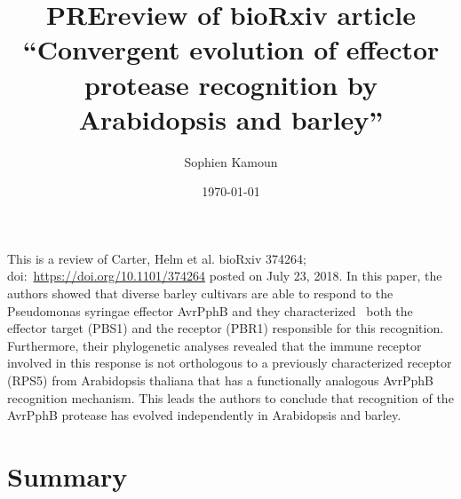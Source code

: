 \documentclass[10pt]{article}
\renewenvironment{abstract}
  {{\bfseries\noindent{\abstractname}\par\nobreak}\footnotesize}
  {\bigskip}
\begin{document}
\title{PREreview of bioRxiv article ``Convergent evolution of effector protease
recognition by Arabidopsis and barley''}



\author[1]{Sophien Kamoun}%
%


\vspace{-1em}



  \date{\today}


\begingroup
\let\center\flushleft
\let\endcenter\endflushleft
\maketitle
\endgroup





\begin{abstract}
This is a review of Carter, Helm et al. bioRxiv 374264;
doi:~\url{https://doi.org/10.1101/374264} posted on July 23, 2018. In
this paper, the authors showed that diverse barley cultivars are able to
respond to the Pseudomonas syringae effector AvrPphB and they
characterized~ both the effector target (PBS1) and the receptor (PBR1)
responsible for this recognition. Furthermore, their phylogenetic
analyses revealed that the immune receptor involved in this response is
not orthologous to a previously characterized receptor (RPS5) from
Arabidopsis thaliana that has a functionally analogous AvrPphB
recognition mechanism. This leads the authors to conclude that
recognition of the AvrPphB protease has evolved independently in
Arabidopsis and barley.%
\end{abstract}%




\par\null

\section*{Summary}

{\label{216049}}\par\null
\end{document}
